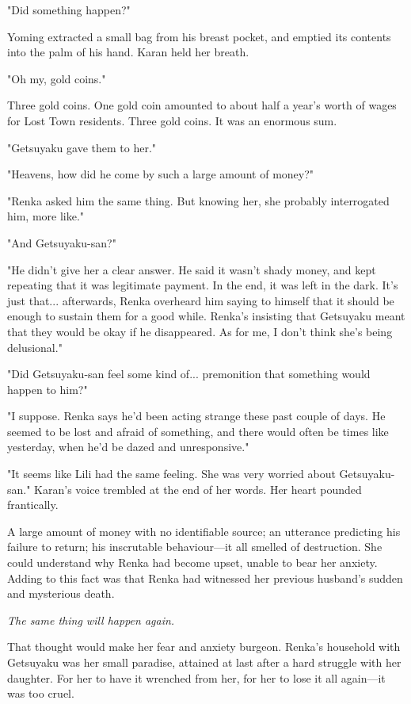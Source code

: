 "Did something happen?"

Yoming extracted a small bag from his breast pocket, and emptied its
contents into the palm of his hand. Karan held her breath.

"Oh my, gold coins."

Three gold coins. One gold coin amounted to about half a year's worth of
wages for Lost Town residents. Three gold coins. It was an enormous sum.

"Getsuyaku gave them to her."

"Heavens, how did he come by such a large amount of money?"

"Renka asked him the same thing. But knowing her, she probably
interrogated him, more like."

"And Getsuyaku-san?"

"He didn't give her a clear answer. He said it wasn't shady money, and
kept repeating that it was legitimate payment. In the end, it was left
in the dark. It's just that... afterwards, Renka overheard him saying to
himself that it should be enough to sustain them for a good while.
Renka's insisting that Getsuyaku meant that they would be okay if he
disappeared. As for me, I don't think she's being delusional."

"Did Getsuyaku-san feel some kind of... premonition that something would
happen to him?"

"I suppose. Renka says he'd been acting strange these past couple of
days. He seemed to be lost and afraid of something, and there would
often be times like yesterday, when he'd be dazed and unresponsive."

"It seems like Lili had the same feeling. She was very worried about
Getsuyaku-san." Karan's voice trembled at the end of her words. Her
heart pounded frantically.

A large amount of money with no identifiable source; an utterance
predicting his failure to return; his inscrutable behaviour---it all
smelled of destruction. She could understand why Renka had become upset,
unable to bear her anxiety. Adding to this fact was that Renka had
witnessed her previous husband's sudden and mysterious death.

\emph{The same thing will happen again.}

That thought would make her fear and anxiety burgeon. Renka's household
with Getsuyaku was her small paradise, attained at last after a hard
struggle with her daughter. For her to have it wrenched from her, for
her to lose it all again---it was too cruel.

